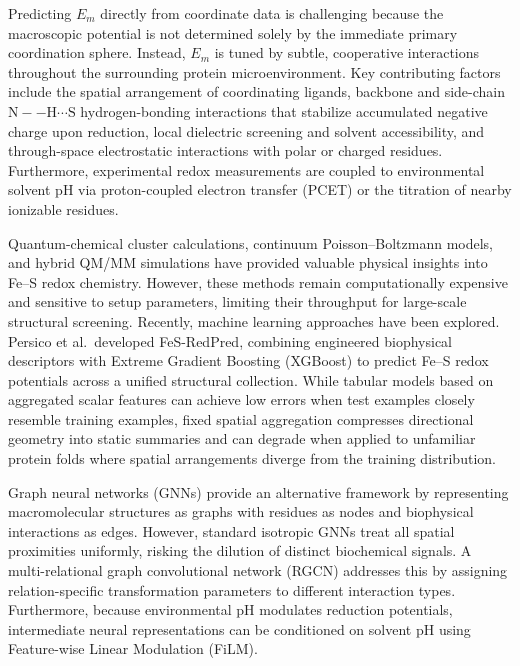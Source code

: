\documentclass[journal=jcisd8,manuscript=article]{achemso}
\begin{document}
Predicting $E_m$ directly from coordinate data is challenging because the macroscopic potential is not determined solely by the immediate primary coordination sphere.\cite{stephens1996protein,niu1999theoretical} Instead, $E_m$ is tuned by subtle, cooperative interactions throughout the surrounding protein microenvironment. Key contributing factors include the spatial arrangement of coordinating ligands, backbone and side-chain $\text{N}--\text{H}\cdots\text{S}$ hydrogen-bonding interactions that stabilize accumulated negative charge upon reduction,\cite{adman1975hydrogen,carter1977iron,swartz1996structural} local dielectric screening and solvent accessibility,\cite{kassner1972effects,churg1986dielectric,honig1995classical} and through-space electrostatic interactions with polar or charged residues.\cite{rees1980experimental} Furthermore, experimental redox measurements are coupled to environmental solvent pH via proton-coupled electron transfer (PCET) or the titration of nearby ionizable residues.\cite{huynh2007proton,zu2001complete,zu2003reduction}

Quantum-chemical cluster calculations,\cite{mouesca1994density,noodleman2004quantum} continuum Poisson--Boltzmann models,\cite{ullmann2002density,torres2003density} and hybrid QM/MM simulations\cite{niu1999theoretical,mancuso2018minimal} have provided valuable physical insights into Fe--S redox chemistry. However, these methods remain computationally expensive and sensitive to setup parameters, limiting their throughput for large-scale structural screening. Recently, machine learning approaches have been explored. Persico et al.\ developed FeS-RedPred,\cite{persico2025predicting} combining engineered biophysical descriptors with Extreme Gradient Boosting (XGBoost)\cite{chen2016xgboost} to predict Fe--S redox potentials across a unified structural collection. While tabular models based on aggregated scalar features can achieve low errors when test examples closely resemble training examples, fixed spatial aggregation compresses directional geometry into static summaries and can degrade when applied to unfamiliar protein folds where spatial arrangements diverge from the training distribution.

Graph neural networks (GNNs) provide an alternative framework by representing macromolecular structures as graphs with residues as nodes and biophysical interactions as edges.\cite{scarselli2008graph,kipf2017semi,gilmer2017neural,dauparas2022robust,jing2021learning,jumper2021highly} However, standard isotropic GNNs treat all spatial proximities uniformly, risking the dilution of distinct biochemical signals. A multi-relational graph convolutional network (RGCN)\cite{schlichtkrull2018modeling} addresses this by assigning relation-specific transformation parameters to different interaction types. Furthermore, because environmental pH modulates reduction potentials, intermediate neural representations can be conditioned on solvent pH using Feature-wise Linear Modulation (FiLM).\cite{perez2018film}
\end{document}
